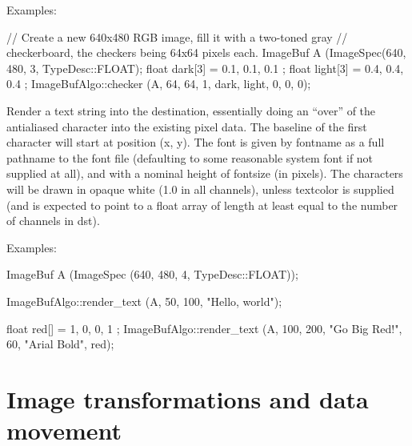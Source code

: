 \smallskip
\noindent Examples:
\begin{code}
    // Create a new 640x480 RGB image, fill it with a two-toned gray
    // checkerboard, the checkers being 64x64 pixels each.
    ImageBuf A (ImageSpec(640, 480, 3, TypeDesc::FLOAT);
    float dark[3] = { 0.1, 0.1, 0.1 };
    float light[3] = { 0.4, 0.4, 0.4 };
    ImageBufAlgo::checker (A, 64, 64, 1, dark, light, 0, 0, 0);
\end{code}
\apiend


 
Render a text string into the destination, essentially doing an ``over'' of
the antialiased character into the existing pixel data.  The baseline of the
first character will start at position ({\cf x, y}).  The font is given by
{\cf fontname} as a full pathname to the font file (defaulting to some
reasonable system font if not supplied at all), and with a nominal
height of {\cf fontsize} (in pixels).  The characters will be drawn in
opaque white (1.0 in all channels), unless {\cf textcolor} is
supplied (and is expected to point to a {\cf float} array of length at
least equal to the number of channels in {\cf dst}).

\smallskip
\noindent Examples:
\begin{code}
    ImageBuf A (ImageSpec (640, 480, 4, TypeDesc::FLOAT));

    ImageBufAlgo::render_text (A, 50, 100, "Hello, world");

    float red[] = { 1, 0, 0, 1 };
    ImageBufAlgo::render_text (A, 100, 200, "Go Big Red!",
                               60, "Arial Bold", red);
\end{code}
\apiend





\section{Image transformations and data movement}
\label{sec:iba:transforms}

 


